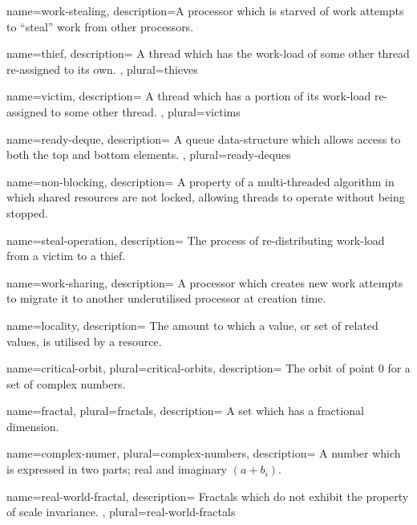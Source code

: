{
    name={work-stealing},
    description={A processor which is starved of work attempts to ``steal'' 
                 work from other processors.}
}

{
    name={thief},
    description={
        A thread which has the work-load of some other thread re-assigned to its own.
    },
    plural={thieves}
}

{
    name={victim},
    description={
        A thread which has a portion of its work-load re-assigned to some other thread.
    },
    plural={victims}
}

{
    name={ready-deque},
    description={
        A queue data-structure which allows access to both the top and bottom elements.
    },
    plural={ready-deques}
}

{
    name={non-blocking},
    description={
        A property of a multi-threaded algorithm in which shared resources are not
        locked, allowing threads to operate without being stopped.
    }
}

{
    name={steal-operation},
    description={
        The process of re-distributing work-load from a victim to a thief.
    }
}

{
    name={work-sharing},
    description={
        A processor which creates new work attempts to migrate it to 
        another underutilised processor at creation time.
    }
}

{
    name={locality},
    description={
        The amount to which a value, or set of related values, is utilised by a resource.
    }
}

{
    name={critical-orbit},
    plural={critical-orbits},
    description={
        The orbit of point \(0\) for a set of complex numbers.
    }
}

{
    name={fractal},
    plural={fractals},
    description={
        A set which has a fractional dimension.
    }
}

{
    name={complex-numer},
    plural={complex-numbers},
    description={
        A number which is expressed in two parts; real and imaginary \((a + b_i)\).
    }
}

{
    name={real-world-fractal},
    description={
        Fractals which do not exhibit the property of scale invariance. 
    },
    plural={real-world-fractals}
}

